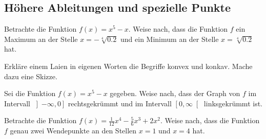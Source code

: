 \documentclass[11pt]{exam}
\begin{document}
\begin{questions}
\newpage
\section{Höhere Ableitungen und spezielle Punkte}
\question[4] %
Betrachte die Funktion $f(x)=x^5-x$. Weise nach, dass die Funktion $f$ ein Maximum an der Stelle $x=-\sqrt[4]{0.2}$ und ein Minimum an der Stelle $x=\sqrt[4]{0.2}$ hat.


\question[2]
Erkläre einem Laien in eigenen Worten die Begriffe \flqq konvex\frqq\: und \flqq konkav\frqq. Mache dazu eine Skizze.


\question[4] %
Sei die Funktion $f(x)=x^5-x$ gegeben. Weise nach, dass der Graph von $f$ im Intervall $\left]-\infty,0\right]$ rechtsgekrümmt und im Intervall $\left[0,\infty\right[$ linksgekrümmt ist.


\question[4] %
Betrachte die Funktion $f(x)=\frac{1}{12}x^4-\frac{5}{6}x^3+2x^2$. Weise nach, dass die Funktion $f$ genau zwei Wendepunkte an den Stellen $x=1$ und $x=4$ hat.


\noaddpoints
\question[\totalpoints]
\addpoints
{}


\noaddpoints
\question[\totalpoints]
\addpoints
{}
\end{questions}
\end{document}
